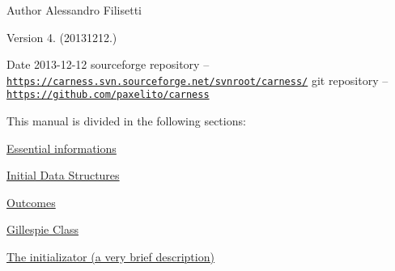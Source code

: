 \begin{DoxyAuthor}{Author}
Alessandro Filisetti 
\end{DoxyAuthor}
\begin{DoxyVersion}{Version}
4. (20131212.) 
\end{DoxyVersion}
\begin{DoxyDate}{Date}
2013-\/12-\/12 sourceforge repository -- \href{https://carness.svn.sourceforge.net/svnroot/carness/}{\tt https\-://carness.\-svn.\-sourceforge.\-net/svnroot/carness/} git repository -- \href{https://github.com/paxelito/carness}{\tt https\-://github.\-com/paxelito/carness}
\end{DoxyDate}
This manual is divided in the following sections\-:
\begin{DoxyItemize}
\item \hyperlink{intro}{Essential informations}
\item \hyperlink{pageInitStr}{Initial Data Structures}
\item \hyperlink{pageoutcomes}{Outcomes}
\item \hyperlink{pageGillespie}{Gillespie Class}
\item \hyperlink{pageInitializator}{The initializator (a very brief description)} 
\end{DoxyItemize}